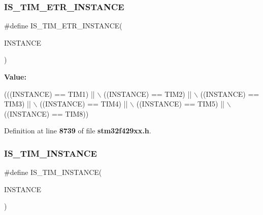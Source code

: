 \mbox{\label{group__Exported__macros_gac71942c3817f1a893ef84fefe69496b7}} 
\subsubsection{I\+S\+\_\+\+T\+I\+M\+\_\+\+E\+T\+R\+\_\+\+I\+N\+S\+T\+A\+N\+CE}
{\footnotesize\ttfamily \#define I\+S\+\_\+\+T\+I\+M\+\_\+\+E\+T\+R\+\_\+\+I\+N\+S\+T\+A\+N\+CE(\begin{DoxyParamCaption}\item[{}]{I\+N\+S\+T\+A\+N\+CE }\end{DoxyParamCaption})}

{\bfseries Value\+:}
\begin{DoxyCode}
(((INSTANCE) == TIM1) || \(\backslash\)
                                        ((INSTANCE) == TIM2) || \(\backslash\)
                                        ((INSTANCE) == TIM3) || \(\backslash\)
                                        ((INSTANCE) == TIM4) || \(\backslash\)
                                        ((INSTANCE) == TIM5) || \(\backslash\)
                                        ((INSTANCE) == TIM8))
\end{DoxyCode}


Definition at line \textbf{ 8739} of file \textbf{ stm32f429xx.\+h}.

\mbox{\label{group__Exported__macros_gaba506eb03409b21388d7c5a6401a4f98}} 
\subsubsection{I\+S\+\_\+\+T\+I\+M\+\_\+\+I\+N\+S\+T\+A\+N\+CE}
{\footnotesize\ttfamily \#define I\+S\+\_\+\+T\+I\+M\+\_\+\+I\+N\+S\+T\+A\+N\+CE(\begin{DoxyParamCaption}\item[{}]{I\+N\+S\+T\+A\+N\+CE }\end{DoxyParamCaption})}

